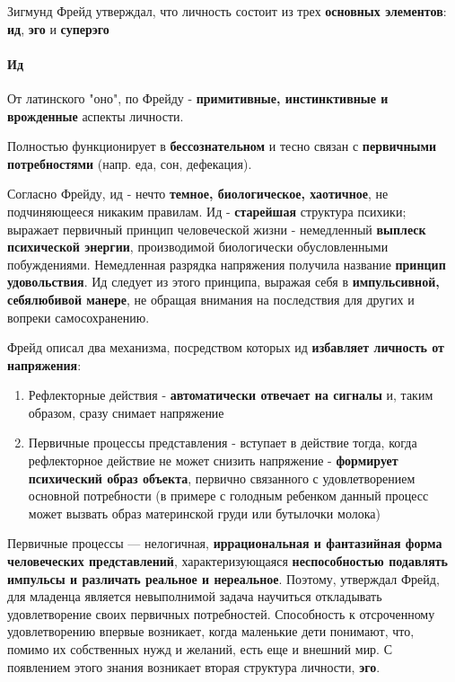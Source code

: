 \documentclass{article}
\begin{document}
\begin{flushleft}

Зигмунд Фрейд утверждал, что личность состоит из трех \textbf{основных элементов}: \textbf{ид}, \textbf{эго} и \textbf{суперэго}

\paragraph{Ид} От латинского "оно", по Фрейду - \textbf{примитивные, инстинктивные и врожденные} аспекты личности.

Полностью функционирует в \textbf{бессознательном} и тесно связан с \textbf{первичными потребностями} (напр. еда, сон, дефекация).

Согласно Фрейду, ид - нечто \textbf{темное, биологическое, хаотичное}, не подчиняющееся никаким правилам. Ид - \textbf{старейшая} структура психики; выражает первичный принцип человеческой жизни - немедленный \textbf{выплеск психической энергии}, производимой биологически обусловленными побуждениями. Немедленная разрядка напряжения получила название \textbf{принцип удовольствия}. Ид следует из этого принципа, выражая себя в \textbf{импульсивной, себялюбивой манере}, не обращая внимания на последствия для других и вопреки самосохранению.

\hfill

Фрейд описал два механизма, посредством которых ид \textbf{избавляет личность от напряжения}:

\begin{enumerate}
    \item Рефлекторные действия - \textbf{автоматически отвечает на сигналы} и, таким образом, сразу снимает напряжение
    \item Первичные процессы представления - вступает в действие тогда, когда рефлекторное действие не может снизить напряжение - \textbf{формирует психический образ объекта}, первично связанного с удовлетворением основной потребности (в примере с голодным ребенком данный процесс может вызвать образ материнской груди или бутылочки молока)
\end{enumerate}

Первичные процессы — нелогичная, \textbf{иррациональная и фантазийная форма человеческих представлений}, характеризующаяся \textbf{неспособностью подавлять импульсы и различать реальное и нереальное}. Поэтому, утверждал Фрейд, для младенца является невыполнимой задача научиться откладывать удовлетворение своих первичных потребностей. Способность к отсроченному удовлетворению впервые возникает, когда маленькие дети понимают, что, помимо их собственных нужд и желаний, есть еще и внешний мир. С появлением этого знания возникает вторая структура личности, \textbf{эго}.


\end{flushleft}
\end{document}
